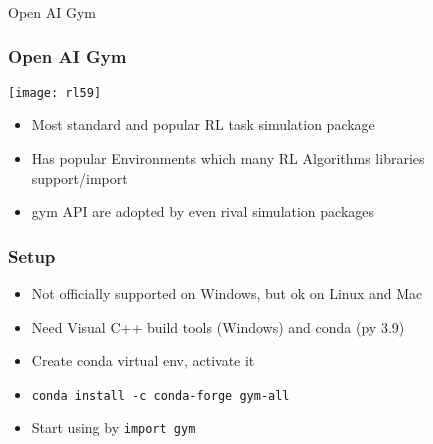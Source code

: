 \begin{frame}[fragile]\frametitle{}
\begin{center}
{\Large Open AI Gym}
\end{center}
\end{frame}

\begin{frame}[fragile]\frametitle{Open AI Gym}

\begin{center}
\texttt{[image: rl59]}
\end{center}

\begin{itemize}
\item Most standard and popular RL task simulation package
\item Has popular Environments which many RL Algorithms libraries support/import
\item gym API are adopted by even rival simulation packages
\end{itemize}

\end{frame}

\begin{frame}[fragile]\frametitle{Setup}

\begin{itemize}
\item Not officially supported on Windows, but ok on Linux and Mac
\item Need Visual C++ build tools (Windows) and conda (py 3.9)
\item Create conda virtual env, activate it
\item \lstinline|conda install -c conda-forge gym-all|
\item Start using by \lstinline|import gym|
\end{itemize}

\end{frame}


